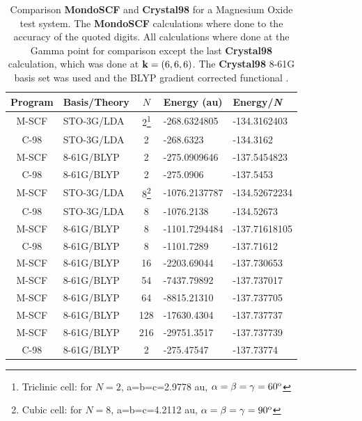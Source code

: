 \documentclass[prb,aps,nobibnotes,twocolumn,doublespace,twocolumngrid,superbib]{revtex4}
\begin{document}
\begin{table}
\caption{Comparison \textbf{MondoSCF} and \textbf{Crystal98} for a 
Magnesium Oxide test system.   The \textbf{MondoSCF} calculations where done to
the accuracy of the quoted digits. All calculations where done at the Gamma point
for comparison except the last \textbf{Crystal98} calculation, which was done at ${\bf k}=(6,6,6)$.
The \textbf{Crystal98} 8-61G  basis set was used \cite{C98Basis} and the BLYP gradient corrected 
functional \cite{Becke93}.}
\label{table:ComToCrystal98_2}

\begin{tabular}{clcll}
\hline 
Program&
Basis/Theory&
\( N \)&
Energy (au)&
Energy/{\it N}\\
\hline
\hline 
M-SCF&
STO-3G/LDA&
2\footnote[1]{Triclinic cell: for $N=2$, a=b=c=2.9778 au, $\alpha=\beta=\gamma=60^{{\rm o}}$}&
-268.6324805 &
-134.3162403 \\
C-98&
STO-3G/LDA&
2\footnotemark[1]&
-268.6323 &
-134.3162 \\
M-SCF&
8-61G/BLYP&
2\footnotemark[1]&
-275.0909646 &
-137.5454823 \\
C-98&
8-61G/BLYP&
2\footnotemark[1]&
-275.0906 &
-137.5453 \\
\hline 
M-SCF&
STO-3G/LDA&
8\footnote[2]{Cubic cell: for $N=8$, a=b=c=4.2112 au, $\alpha=\beta=\gamma=90^{{\rm o}}$}&
-1076.2137787 &
-134.52672234 \\
C-98&
STO-3G/LDA&
8\footnotemark[2]&
-1076.2138 &
-134.52673\\
M-SCF&
8-61G/BLYP&
8\footnotemark[2]&
-1101.7294484 &
-137.71618105\\
C-98&
8-61G/BLYP&
8\footnotemark[2]&
-1101.7289 &
-137.71612  \\
\hline 
M-SCF&
8-61G/BLYP&
16\footnotemark[1]&
-2203.69044 &
-137.730653 \\
M-SCF&
8-61G/BLYP&
54\footnotemark[1]&
-7437.79892 &
-137.737017\\
M-SCF&
8-61G/BLYP&
64\footnotemark[2]&
-8815.21310 &
-137.737705\\
M-SCF&
8-61G/BLYP&
128\footnotemark[1]&
-17630.4304 &
-137.737737 \\
M-SCF&
8-61G/BLYP&
216\footnotemark[2]&
-29751.3517 &
-137.737739 \\
\hline
\,\,C-98\,\,&
8-61G/BLYP\,\,&
\,\,2\footnotemark[1]\,\,&
-275.47547 &
-137.73774  \\ 
\hline
\end{tabular}
\end{table}
%
%
%
\end{document}
